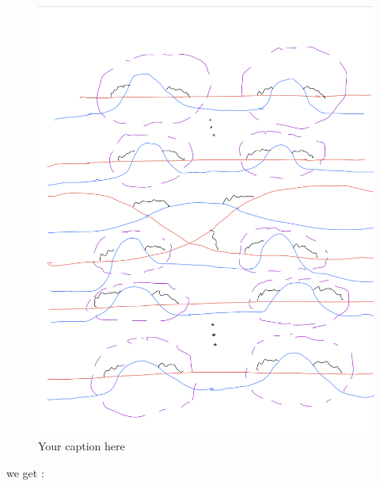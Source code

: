 \begin{figure}[H] %
    \centering
    \includegraphics[width=\linewidth]{diagrams/definition12/3.png} %
    \caption{Your caption here}
    \label{fig:your-label}
\end{figure}

we get :


